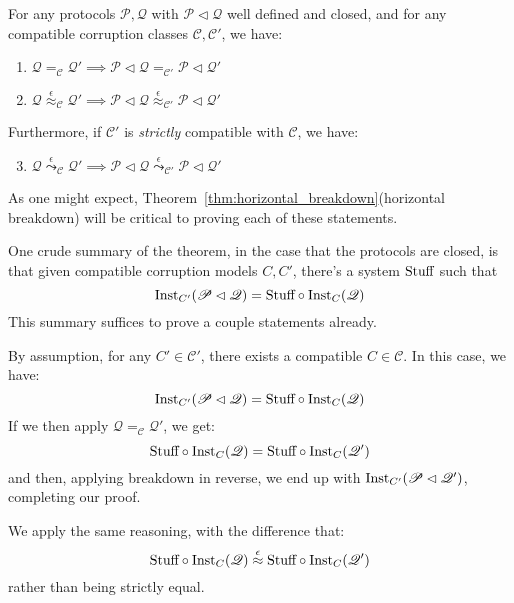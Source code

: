 \begin{theorem}
  \label{thm:horizontal_composition_theorem}
  For any protocols $\mathscr{P}, \mathscr{Q}$ with $\mathscr{P} \lhd \mathscr{Q}$
  well defined and closed, and for any compatible corruption classes $\mathscr{C}, \mathscr{C'}$, we have:
  \begin{enumerate}
    \item $\mathscr{Q} =_{\mathscr{C}} \mathscr{Q}' \implies \mathscr{P} \lhd \mathscr{Q} =_{\mathscr{C}'} \mathscr{P} \lhd \mathscr{Q}'$
    \item $\mathscr{Q} \overset{\epsilon}{\approx}_{\mathscr{C}} \mathscr{Q}' \implies \mathscr{P} \lhd \mathscr{Q} \overset{\epsilon}{\approx}_{\mathscr{C}'} \mathscr{P} \lhd \mathscr{Q}'$
  \end{enumerate}

  Furthermore, if $\mathscr{C}'$ is \emph{strictly} compatible with $\mathscr{C}$,
  we have:
  \begin{enumerate}
    \setcounter{enumi}{2}
    \item $\mathscr{Q} \overset{\epsilon}{\leadsto}_{\mathscr{C}} \mathscr{Q}' \implies \mathscr{P} \lhd \mathscr{Q} \overset{\epsilon}{\leadsto}_{\mathscr{C}'} \mathscr{P} \lhd \mathscr{Q}'$
  \end{enumerate}

   As one might expect,
  Theorem~\ref{thm:horizontal_breakdown}(horizontal breakdown)
  will be critical to proving each of these statements.

  One crude summary of the theorem, in the case
  that the protocols are closed, is that given compatible
  corruption models $C, C'$, there's a system $\text{Stuff}$ such that
  $$
  \text{Inst}_{C'}(\mathscr{P} \lhd \mathscr{Q}) = \text{Stuff} \circ \text{Inst}_C(\mathscr{Q})
  $$
  This summary suffices to prove a couple statements already.

   By assumption, for any $C' \in \mathscr{C}'$,
  there exists a compatible $C \in \mathscr{C}$.
  In this case, we have:
  $$
  \text{Inst}_{C'}(\mathscr{P} \lhd \mathscr{Q}) = \text{Stuff} \circ \text{Inst}_C(\mathscr{Q})
  $$
  If we then apply $\mathscr{Q} =_{\mathscr{C}} \mathscr{Q}'$,
  we get:
  $$
  \text{Stuff} \circ \text{Inst}_C(\mathscr{Q}) = \text{Stuff} \circ \text{Inst}_C(\mathscr{Q}')
  $$
  and then, applying breakdown in reverse, we end up with $\text{Inst}_{C'}(\mathscr{P} \lhd \mathscr{Q}')$,
  completing our proof.

   We apply the same reasoning, with the difference that:
  $$
  \text{Stuff} \circ \text{Inst}_C(\mathscr{Q}) \overset{\epsilon}{\approx} \text{Stuff} \circ \text{Inst}_C(\mathscr{Q}')
  $$
  rather than being strictly equal.


\end{theorem}
